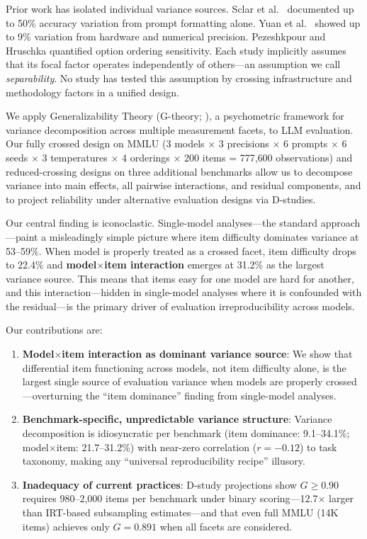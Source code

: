 \documentclass[11pt,twocolumn]{article}
\newcommand{\Gcoeff}{\ensuremath{G}}
\newcommand{\pct}{\%}
\begin{document}
Prior work has isolated individual variance sources. Sclar et al.\  documented up to 50\pct{} accuracy variation from prompt formatting alone. Yuan et al.\  showed up to 9\pct{} variation from hardware and numerical precision. Pezeshkpour and Hruschka  quantified option ordering sensitivity. Each study implicitly assumes that its focal factor operates independently of others---an assumption we call \emph{separability}. No study has tested this assumption by crossing infrastructure and methodology factors in a unified design.

We apply Generalizability Theory (G-theory; \citealt{shavelson1991generalizability,brennan2001generalizability}), a psychometric framework for variance decomposition across multiple measurement facets, to LLM evaluation. Our fully crossed design on MMLU (3 models $\times$ 3 precisions $\times$ 6 prompts $\times$ 6 seeds $\times$ 3 temperatures $\times$ 4 orderings $\times$ 200 items = 777{,}600 observations) and reduced-crossing designs on three additional benchmarks allow us to decompose variance into main effects, all pairwise interactions, and residual components, and to project reliability under alternative evaluation designs via D-studies.

Our central finding is iconoclastic. Single-model analyses---the standard approach---paint a misleadingly simple picture where item difficulty dominates variance at 53--59\pct{}. When model is properly treated as a crossed facet, item difficulty drops to 22.4\pct{} and \textbf{model$\times$item interaction} emerges at 31.2\pct{} as the largest variance source. This means that items easy for one model are hard for another, and this interaction---hidden in single-model analyses where it is confounded with the residual---is the primary driver of evaluation irreproducibility across models.

Our contributions are:
\begin{enumerate}
\item \textbf{Model$\times$item interaction as dominant variance source}: We show that differential item functioning across models, not item difficulty alone, is the largest single source of evaluation variance when models are properly crossed---overturning the ``item dominance'' finding from single-model analyses.
\item \textbf{Benchmark-specific, unpredictable variance structure}: Variance decomposition is idiosyncratic per benchmark (item dominance: 9.1--34.1\pct{}; model$\times$item: 21.7--31.2\pct{}) with near-zero correlation ($r=-0.12$) to task taxonomy, making any ``universal reproducibility recipe'' illusory.
\item \textbf{Inadequacy of current practices}: D-study projections show $\Gcoeff \geq 0.90$ requires 980--2{,}000 items per benchmark under binary scoring---12.7$\times$ larger than IRT-based subsampling estimates---and that even full MMLU (14K items) achieves only $\Gcoeff=0.891$ when all facets are considered.
\end{enumerate}
\end{document}

